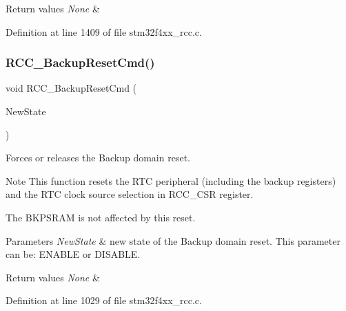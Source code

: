 \begin{DoxyRetVals}{Return values}
{\em None} & \\
\hline
\end{DoxyRetVals}


Definition at line 1409 of file stm32f4xx\+\_\+rcc.\+c.

\mbox{\label{group___r_c_c___group3_ga636c3b72f35391e67f12a551b15fa54a}} 
\subsubsection{\texorpdfstring{R\+C\+C\+\_\+\+Backup\+Reset\+Cmd()}{RCC\_BackupResetCmd()}}
{\footnotesize\ttfamily void R\+C\+C\+\_\+\+Backup\+Reset\+Cmd (\begin{DoxyParamCaption}\item[{Functional\+State}]{New\+State }\end{DoxyParamCaption})}



Forces or releases the Backup domain reset. 

\begin{DoxyNote}{Note}
This function resets the R\+TC peripheral (including the backup registers) and the R\+TC clock source selection in R\+C\+C\+\_\+\+C\+SR register. 

The B\+K\+P\+S\+R\+AM is not affected by this reset. 
\end{DoxyNote}

\begin{DoxyParams}{Parameters}
{\em New\+State} & new state of the Backup domain reset. This parameter can be\+: E\+N\+A\+B\+LE or D\+I\+S\+A\+B\+LE. \\
\hline
\end{DoxyParams}

\begin{DoxyRetVals}{Return values}
{\em None} & \\
\hline
\end{DoxyRetVals}


Definition at line 1029 of file stm32f4xx\+\_\+rcc.\+c.

\mbox{\label{group___r_c_c___group3_ga6c56f8529988fcc8f4dbffbc1bab27d0}} 
